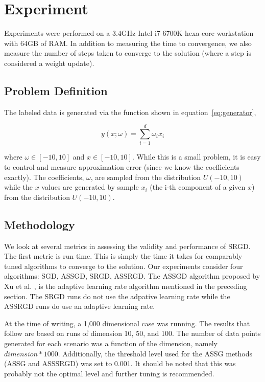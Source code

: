 \documentclass[conference,compsoc]{IEEEtran}
\begin{document}
\section{Experiment}
Experiments were performed on a 3.4GHz Intel i7-6700K hexa-core workstation with 64GB
of RAM. In addition to measuring the time to convergence, we also measure the
number of steps taken to converge to the solution (where a step is considered a
weight update).

\subsection{Problem Definition}
The labeled data is generated via the function shown in
equation~\ref{eq:generator},

\begin{equation}\label{eq:generator}
    y(x;\omega) = \sum_{i=1}^d \omega_i x_i
\end{equation}

where $\omega \in [-10, 10]$ and $x \in [-10, 10]$. While this is a small problem,
it is easy to control and measure approximation error (since we know the
coefficients exactly). The coefficients, $\omega$, are sampled from the
distribution $U(-10, 10)$ while the $x$ values are generated by sample $x_i$ (the
i-th component of a given $x$) from the distribution $U(-10,10)$.

\subsection{Methodology}
We look at several metrics in assessing the validity and performance of SRGD. The
first metric is run time. This is simply the time it takes for comparably tuned
algorithms to converge to the solution. Our experiments consider four
algorithms: SGD, ASSGD, SRGD, ASSRGD. The ASSGD algorithm proposed by Xu et
al. \cite{bib:xu-assgd}, is the adaptive learning rate algorithm mentioned in the
preceding section. The SRGD runs do not use the adpative learning rate while
the ASSRGD runs do use an adaptive learning rate.

At the time of writing, a 1,000 dimensional case was running. The results that
follow are based on runs of dimension 10, 50, and 100. The number of data points
generated for each scenario was a function of the dimension, namely $dimension * 1000$.
Additionally, the threshold level used for the ASSG methods (ASSG and ASSSRGD) was
set to 0.001. It should be noted that this was probably not the optimal level and
further tuning is recommended.
\end{document}
